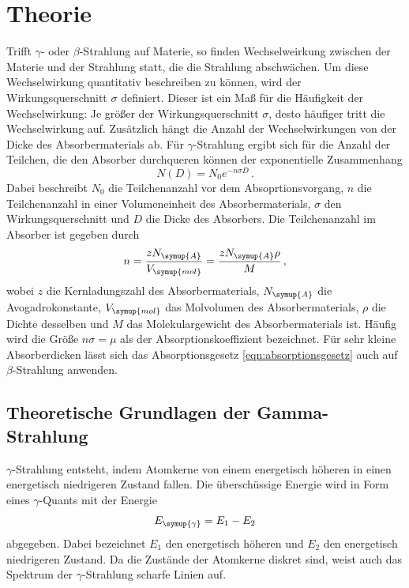 \section{Theorie}
\label{sec:Theorie}
Trifft $\gamma$- oder $\beta$-Strahlung auf Materie, so finden Wechselweirkung
zwischen der Materie und der Strahlung statt, die die Strahlung abschwächen. Um
diese Wechselwirkung quantitativ beschreiben zu können, wird der Wirkungsquerschnitt
$\sigma$ definiert. Dieser ist ein Maß für die Häufigkeit der Wechselwirkung: Je größer
der Wirkungsquerschnitt $\sigma$, desto häufiger tritt die Wechselwirkung auf.
Zusätzlich hängt die Anzahl der Wechselwirkungen von der Dicke des Absorbermaterials ab.
Für $\gamma$-Strahlung ergibt sich für die Anzahl der Teilchen, die den Absorber
durchqueren können der exponentielle Zusammenhang
\begin{equation}
  N(D)=N_0 e^{-n \sigma D} \,.
  \label{eqn:absorptionsgesetz}
\end{equation}
Dabei beschreibt $N_0$ die Teilchenanzahl vor dem Absoprtionsvorgang, $n$ die
Teilchenanzahl in einer Volumeneinheit des Absorbermaterials, $\sigma$ den Wirkungsquerschnitt
und $D$ die Dicke des Absorbers. Die Teilchenanzahl im Absorber ist gegeben durch
\begin{equation}
 n=\frac{z N_{\symup{A}}}{V_{\symup{mol}}}=\frac{z N_{\symup{A}} \rho}{M} \,,
\end{equation}
wobei $z$ die Kernladungszahl des Absorbermaterials, $N_{\symup{A}}$ die Avogadrokonstante,
$V_{\symup{mol}}$ das Molvolumen des Absorbermaterials, $\rho$ die Dichte desselben und
$M$ das Molekulargewicht des Absorbermaterials ist.
Häufig  wird die Größe $n \sigma =\mu$ als der Absorptionskoeffizient bezeichnet.
Für sehr kleine Absorberdicken lässt sich das Absorptionsgesetz \eqref{eqn:absorptionsgesetz}
auch auf $\beta$-Strahlung anwenden.


\subsection{Theoretische Grundlagen der Gamma-Strahlung} %
\label{subsec:gamma}

$\gamma$-Strahlung entsteht, indem Atomkerne von einem energetisch höheren in einen
energetisch niedrigeren Zustand fallen. Die überschüssige Energie wird in Form eines
$\gamma$-Quants mit der Energie
\begin{equation}
  E_{\symup{\gamma}}= E_1 - E_2
\end{equation}
abgegeben. Dabei bezeichnet $E_1$ den energetisch höheren und $E_2$ den energetisch
niedrigeren Zustand. Da die Zustände der Atomkerne diskret sind, weist auch das
Spektrum der $\gamma$-Strahlung scharfe Linien auf.

